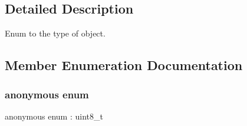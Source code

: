 \subsection{Detailed Description}
Enum to the type of object. 

\subsection{Member Enumeration Documentation}
\mbox{\label{structmaf__perception__interface_1_1ObjectTypeEnum_a0feb8a86b2b3843588f264c80a218f7f}} 
\subsubsection{\texorpdfstring{anonymous enum}{anonymous enum}}
{\footnotesize\ttfamily anonymous enum \+: uint8\+\_\+t}

